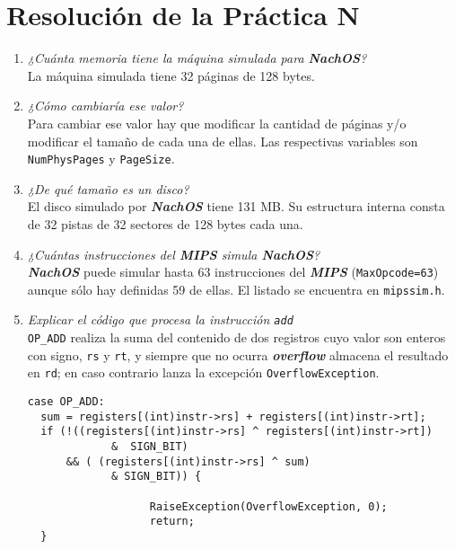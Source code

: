 \chapter{Resolución de la Práctica N}
\begin{enumerate}
    \item \textit{¿Cuánta memoria tiene la máquina simulada para \textbf{\textit{NachOS}}?}\\
    La máquina simulada tiene 32 páginas de 128 bytes.
    \item \textit{¿Cómo cambiaría ese valor?}\\
    Para cambiar ese valor hay que modificar la cantidad de páginas y/o modificar el tamaño de cada una de ellas. Las respectivas variables son \texttt{NumPhysPages} y \texttt{PageSize}. 
    \item \textit{¿De qué tamaño es un disco?}\\
    El disco simulado por \textbf{\textit{NachOS}} tiene 131 MB. Su estructura interna consta de 32 pistas de 32 sectores de 128 bytes cada una.
    \item \textit{¿Cuántas instrucciones del \textbf{\textit{MIPS}} simula \textbf{\textit{NachOS}}?}\\
\textbf{\textit{NachOS}} puede simular hasta 63 instrucciones del \textbf{\textit{MIPS}} (\texttt{MaxOpcode=63}) aunque sólo hay definidas 59 de ellas. El listado se encuentra en \texttt{mipssim.h}.
    \item \textit{Explicar el código que procesa la instrucción \texttt{add}}\\
\texttt{OP\_ADD} realiza la suma del contenido de dos registros cuyo valor son enteros con signo, \texttt{rs} y \texttt{rt}, y siempre que no ocurra \textbf{\textit{overflow}} almacena el resultado en \texttt{rd}; en caso contrario lanza la excepción \texttt{OverflowException}.
\begin{lstlisting}[style=C]
case OP_ADD:
  sum = registers[(int)instr->rs] + registers[(int)instr->rt];
  if (!((registers[(int)instr->rs] ^ registers[(int)instr->rt])
             &  SIGN_BIT) 
      && ( (registers[(int)instr->rs] ^ sum)
             & SIGN_BIT)) {

                   RaiseException(OverflowException, 0);
                   return;
  }
  

\end{lstlisting}
\end{enumerate}
